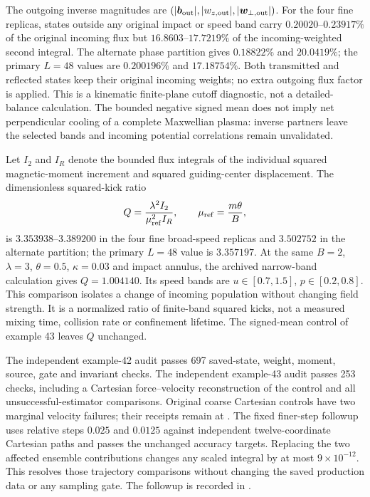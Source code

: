\documentclass[11pt,letterpaper]{article}
\begin{document}
The outgoing inverse magnitudes are
$(|\bm b_{\rm out}|,|w_{z,\rm out}|,|\bm w_{\perp,\rm out}|)$.
For the four fine replicas, states outside any original impact or speed
band carry $0.20020$--$0.23917\%$ of the original incoming flux but
$16.8603$--$17.7219\%$ of the incoming-weighted second integral.
The alternate phase partition gives $0.18822\%$ and $20.0419\%$;
the primary $L=48$ values are $0.200196\%$ and $17.18754\%$.
Both transmitted and reflected states keep their original incoming weights;
no extra outgoing flux factor is applied. This is a kinematic finite-plane
cutoff diagnostic, not a detailed-balance calculation. The bounded negative
signed mean does not imply net perpendicular cooling of a complete
Maxwellian plasma: inverse partners leave the selected bands and incoming
potential correlations remain unvalidated.

Let $I_2$ and $I_R$ denote the bounded flux integrals of the individual
squared magnetic-moment increment and squared guiding-center displacement.
The dimensionless squared-kick ratio
\[
 Q=\frac{\lambda^2 I_2}{\mu_{\rm ref}^2 I_R},\qquad
 \mu_{\rm ref}=\frac{m\theta}{B},
\]
is $3.353938$--$3.389200$ in the four fine broad-speed replicas and
$3.502752$ in the alternate partition; the primary $L=48$ value is
$3.357197$. At the same $B=2$, $\lambda=3$, $\theta=0.5$, $\kappa=0.03$
and impact annulus, the archived narrow-band calculation gives $Q=1.004140$.
Its speed bands are $u\in[0.7,1.5]$, $p\in[0.2,0.8]$. This comparison
isolates a change of incoming population without changing field strength.
It is a normalized ratio of finite-band squared kicks, not a measured
mixing time, collision rate or confinement lifetime. The signed-mean
control of example 43 leaves $Q$ unchanged.

The independent example-42 audit passes 697 saved-state, weight, moment,
source, gate and invariant checks. The independent example-43 audit passes
253 checks, including a Cartesian force--velocity reconstruction of the
control and all unsuccessful-estimator comparisons. Original coarse
Cartesian controls have two marginal velocity failures; their receipts
remain at .
The fixed finer-step followup uses relative steps $0.025$ and $0.0125$
against independent twelve-coordinate Cartesian paths and passes the
unchanged accuracy targets. Replacing the two affected ensemble
contributions changes any scaled integral by at most $9\times10^{-12}$.
This resolves those trajectory comparisons without changing the saved
production data or any sampling gate. The followup is recorded in
.
\end{document}

